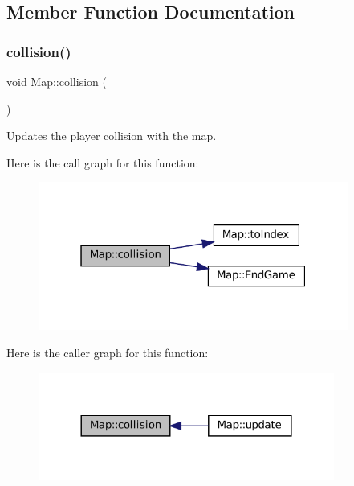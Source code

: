 \subsection{Member Function Documentation}
\mbox{\label{classMap_ae2311b25220590e05479d66408eeaabf}} 
\subsubsection{\texorpdfstring{collision()}{collision()}}
{\footnotesize\ttfamily void Map\+::collision (\begin{DoxyParamCaption}{ }\end{DoxyParamCaption})}



Updates the player collision with the map. 

Here is the call graph for this function\+:\nopagebreak
\begin{figure}[H]
\begin{center}
\leavevmode
\includegraphics[width=289pt]{classMap_ae2311b25220590e05479d66408eeaabf_cgraph}
\end{center}
\end{figure}
Here is the caller graph for this function\+:\nopagebreak
\begin{figure}[H]
\begin{center}
\leavevmode
\includegraphics[width=276pt]{classMap_ae2311b25220590e05479d66408eeaabf_icgraph}
\end{center}
\end{figure}
\mbox{\label{classMap_a8485dce46ceae190bc9f51e22885eca3}} 
